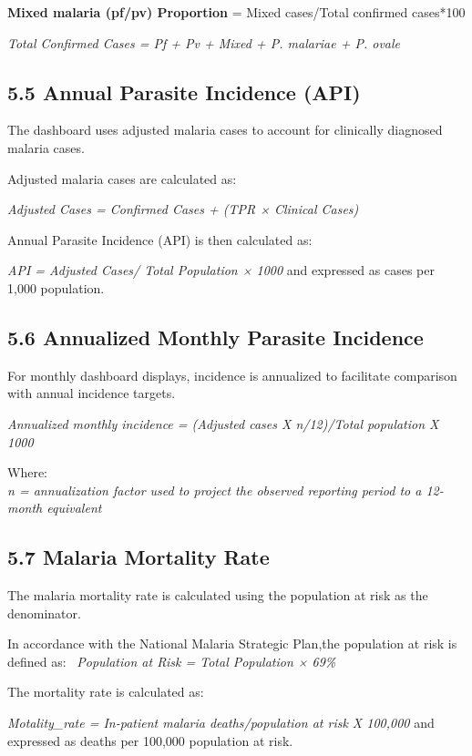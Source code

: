 \documentclass[
  letterpaper,
  DIV=11,
  numbers=noendperiod]{scrartcl}
\begin{document}
\textbf{Mixed malaria (pf/pv) Proportion} = Mixed cases/Total confirmed
cases*100

\emph{Total Confirmed Cases = Pf + Pv + Mixed + P. malariae + P. ovale}

\subsection{5.5 Annual Parasite Incidence
(API)}\label{annual-parasite-incidence-api}

The dashboard uses adjusted malaria cases to account for clinically
diagnosed malaria cases.

Adjusted malaria cases are calculated as:

\emph{Adjusted Cases = Confirmed Cases + (TPR × Clinical Cases)}

Annual Parasite Incidence (API) is then calculated as:

\emph{API = Adjusted Cases/ Total Population × 1000} and expressed as
cases per 1,000 population.

\subsection{5.6 Annualized Monthly Parasite
Incidence}\label{annualized-monthly-parasite-incidence}

For monthly dashboard displays, incidence is annualized to facilitate
comparison with annual incidence targets.

\emph{Annualized monthly incidence = (Adjusted cases X n/12)/Total
population X 1000}

Where:\\
\emph{n = annualization factor used to project the observed reporting
period to a 12-month equivalent}

\subsection{5.7 Malaria Mortality Rate}\label{malaria-mortality-rate}

The malaria mortality rate is calculated using the population at risk as
the denominator.

In accordance with the National Malaria Strategic Plan,the population at
risk is defined as:~ \emph{Population at Risk = Total Population × 69\%}

The mortality rate is calculated as:

\emph{Motality\_rate = In-patient malaria deaths/population at risk X
100,000} and expressed as deaths per 100,000 population at risk.
\end{document}
